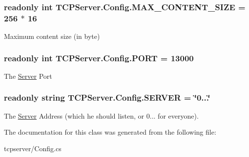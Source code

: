 \subsubsection[{M\+A\+X\+\_\+\+C\+O\+N\+T\+E\+N\+T\+\_\+\+S\+I\+Z\+E}]{\setlength{\rightskip}{0pt plus 5cm}readonly int T\+C\+P\+Server.\+Config.\+M\+A\+X\+\_\+\+C\+O\+N\+T\+E\+N\+T\+\_\+\+S\+I\+Z\+E = 256 $\ast$ 16\hspace{0.3cm}{\ttfamily [static]}}\label{classTCPServer_1_1Config_a47b1681acf21be479018e3c93cbeaa5e}


Maximum content size (in byte) 

\hypertarget{classTCPServer_1_1Config_ac5d512f1a28d2c8c42bd175095eaacf7}{}
\subsubsection[{P\+O\+R\+T}]{\setlength{\rightskip}{0pt plus 5cm}readonly int T\+C\+P\+Server.\+Config.\+P\+O\+R\+T = 13000\hspace{0.3cm}{\ttfamily [static]}}\label{classTCPServer_1_1Config_ac5d512f1a28d2c8c42bd175095eaacf7}


The \hyperlink{namespaceServer}{Server} Port 

\hypertarget{classTCPServer_1_1Config_a22ee5c50b7d042facea60ec7ee40d836}{}
\subsubsection[{S\+E\+R\+V\+E\+R}]{\setlength{\rightskip}{0pt plus 5cm}readonly string T\+C\+P\+Server.\+Config.\+S\+E\+R\+V\+E\+R = \char`\"{}0...\char`\"{}\hspace{0.3cm}{\ttfamily [static]}}\label{classTCPServer_1_1Config_a22ee5c50b7d042facea60ec7ee40d836}


The \hyperlink{namespaceServer}{Server} Address (which he should listen, or 0... for everyone). 



The documentation for this class was generated from the following file\+:\begin{DoxyCompactItemize}
\item 
tcpserver/Config.\+cs\end{DoxyCompactItemize}
